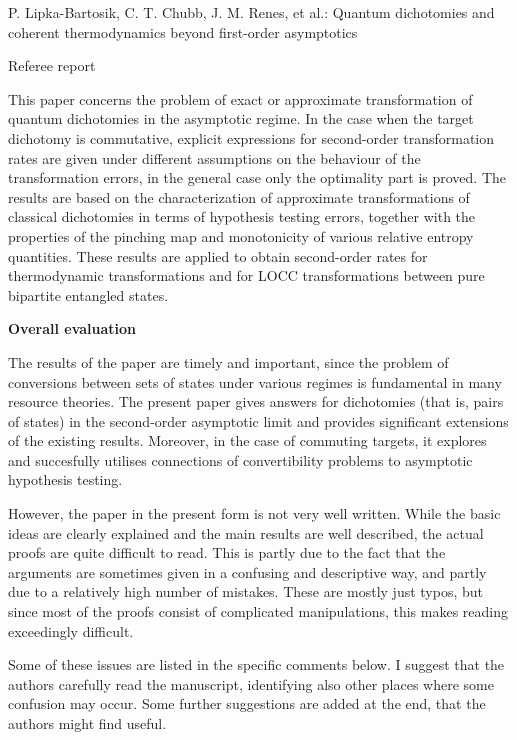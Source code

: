 \documentclass[12pt]{article}
\begin{document}
\begin{center}
{\large  P. Lipka-Bartosik, C. T. Chubb, J. M. Renes, et al.: Quantum dichotomies and coherent thermodynamics beyond first-order asymptotics}

\end{center}
\medskip

\centerline{Referee report}

\bigskip



This paper concerns the problem of exact or approximate transformation of quantum dichotomies in the asymptotic
regime. In the case when the target dichotomy is commutative, explicit expressions for second-order
transformation rates are given under different assumptions on the behaviour of the
 transformation errors, in the general case only the optimality part is proved. The
 results are based on the characterization of approximate transformations of
 classical dichotomies in terms of hypothesis testing errors, together with the properties
 of the pinching map and monotonicity of various relative entropy quantities. These  results are applied to obtain second-order rates for thermodynamic
 transformations and for LOCC transformations between pure bipartite entangled states.

\medskip

\noindent
\textbf{Overall evaluation}

\medskip
 The results of the paper are timely and important, since the problem of conversions
 between sets of states under various regimes is fundamental in many resource theories.
 The present paper gives answers for dichotomies (that is, pairs of states) in the
 second-order asymptotic limit and provides significant extensions of the existing
 results. Moreover, in the case of commuting targets, it explores and succesfully utilises 
 connections of convertibility  problems to asymptotic hypothesis testing.


 However, the paper in the present form is not very well written. While the basic  ideas are
 clearly explained  and the main results are well described, the actual proofs are quite difficult to read. 
 This is partly due to the fact that the arguments are sometimes given in a confusing and
 descriptive way, and partly due to a relatively high number of mistakes. These are mostly
 just typos, but since most of the proofs consist of complicated manipulations, this makes
 reading exceedingly difficult. 

 Some of these issues are listed  in the specific comments below. I suggest that the authors
  carefully read the manuscript, identifying also other places where some confusion may occur.
  Some further suggestions are added at the end, that the authors might find useful.
\end{document}
